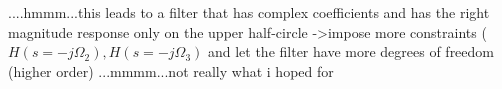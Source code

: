 ....hmmm...this leads to a filter that has complex coefficients and has the right magnitude response only on the upper half-circle
->impose more constraints ($H(s=-j \Omega_2), H(s=-j \Omega_3)$ and let the filter have more degrees of freedom (higher order)
...mmmm...not really what i hoped for























